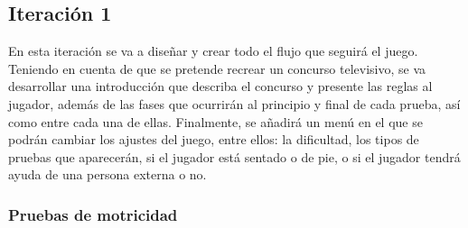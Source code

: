 
\subsection{Iteración 1}

En esta iteración se va a diseñar y crear todo el flujo que seguirá el juego. Teniendo en cuenta de que se pretende recrear un concurso televisivo, se va desarrollar una introducción que describa el concurso y presente las reglas al jugador, además de las fases que ocurrirán al principio y final de cada prueba, así como entre cada una de ellas. Finalmente, se añadirá un menú en el que se podrán cambiar los ajustes del juego, entre ellos: la dificultad, los tipos de pruebas que aparecerán, si el jugador está sentado o de pie, o si el jugador tendrá ayuda de una persona externa o no.


\subsubsection{Pruebas de motricidad}









